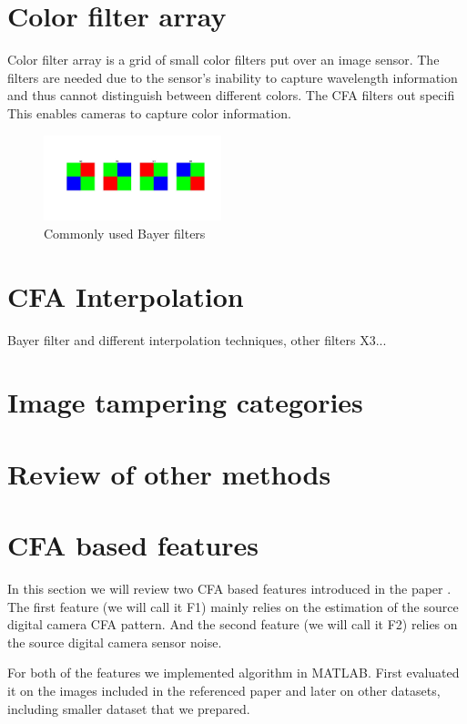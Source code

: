 \documentclass{template/acm_proc_article-sp}
\begin{document}
\section{Color filter array}
Color filter array is a grid of small color filters put over an image sensor.
The filters are needed due to the sensor's inability to capture wavelength 
information and thus cannot distinguish between different colors.
The CFA filters out specifi
This enables cameras to capture color information.

\begin{figure}
\centering
\includegraphics[trim=175 200 100 205,clip,width=0.46\textwidth]{report/results/4_bayer_filters.jpg}
\caption{Commonly used Bayer filters}
\label{img_4_bayer_filters}
\end{figure}

\section{CFA Interpolation}
Bayer filter and different interpolation techniques, other filters X3...

\section{Image tampering categories}

\section{Review of other methods}


\section{CFA based features}
In this section we will review two CFA based features introduced in the paper \cite{dirik2009image}. The first feature (we will call it F1) mainly relies on the estimation of the source digital camera CFA pattern. And the second feature (we will call it F2) relies on the source digital camera sensor noise.

For both of the features we implemented algorithm in MATLAB. First evaluated it on the images included in the referenced paper \cite{dirik2009image} and later on other datasets, including smaller dataset that we prepared.
\end{document}
